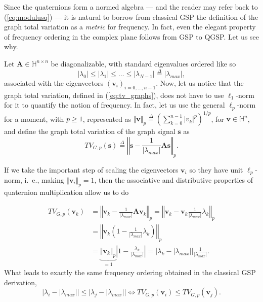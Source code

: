 Since the quaternions form a normed algebra --- and the reader may refer back to (\ref{eq:modulusq}) --- it is natural to borrow from classical GSP the definition of the graph total variation as a \textit{metric} for frequency. In fact, even the elegant property of frequency ordering in the complex plane follows from GSP to QGSP. Let us see why.

Let $ \mathbf{A} \in \mathbb{H}^{n \times n}$ be diagonalizable, with standard eigenvalues ordered like so
\begin{equation}
\label{eq:eig_order_q}
|\lambda_0| \leq |\lambda_1| \leq \dots \leq |\lambda_{N-1}| \overset{\Delta}{=} |\lambda_{max}|,
\end{equation}
associated with the eigenvectors $ (\mathbf{v}_i)_{i=0,\dots,n-1} $.
Now, let us notice that the graph total variation, defined in (\ref{eq:tv_graphs}), does not have to use $ \ell_1 $-norm for it to quantify the notion of frequency. In fact, let us use the general $ \ell_p $-norm for a moment, with $p \geq 1$, represented as $ \Vert \mathbf{v}\Vert_p \overset{\Delta}{=} \left(\sum_{k=0}^{n-1} |v_k|^p\right)^{1/p} $, for $\mathbf{v} \in \mathbb{H}^n$, and define the graph total variation of the graph signal $\mathbf{s}$ as
\begin{equation}
\label{eq:tv_graphsq}
TV_{G, p}(\mathbf{s}) \overset{\Delta}{=} \left\Vert \mathbf{s} - \frac{1}{|\lambda_{max}|}\mathbf{A} \mathbf{s} \right\Vert_p.
\end{equation}

If we take the important step of scaling the eigenvectors $\mathbf{v}_i$ so they have unit $\ell_p$-norm, i.~e., making $\Vert \mathbf{v}_i\Vert_p = 1$, then the associative and distributive properties of quaternion multiplication allow us to do

\begin{equation}
\begin{aligned}
TV_{G, p}(\mathbf{v}_k) &=
\left\Vert \mathbf{v}_k - \frac{1}{|\lambda_{max}|} \mathbf{A} \mathbf{v}_k \right\Vert_p =
\left\Vert\mathbf{v}_k - \mathbf{v}_k \frac{1}{|\lambda_{max}|} \lambda_k \right\Vert_p \\
&= \left\Vert\mathbf{v}_k \left( 1 -  \frac{1}{|\lambda_{max}|} \lambda_k \right) \right\Vert_p \\
&=
\underbrace{\Vert \mathbf{v}_k \Vert_p}_{= 1} \left|1 - \frac{\lambda_k}{|\lambda_{max}|}\right| = \Big| \lambda_k - |\lambda_{max}| \Big| \frac{1}{|\lambda_{max}|}.
\end{aligned}
\end{equation}
What leads to exactly the same frequency ordering obtained in the classical GSP derivation,
\begin{equation}
\label{eq:TV_ordering_q}
\Big| \! \lambda_i  - \! |\lambda_{max}|\Big| \! \leq \! \Big|  \lambda_j  - \! |\lambda_{max}|\Big| \! \! \iff \! \! TV_{G, p}(\mathbf{v}_i) \leq TV_{G, p}(\mathbf{v}_j).
\end{equation}

